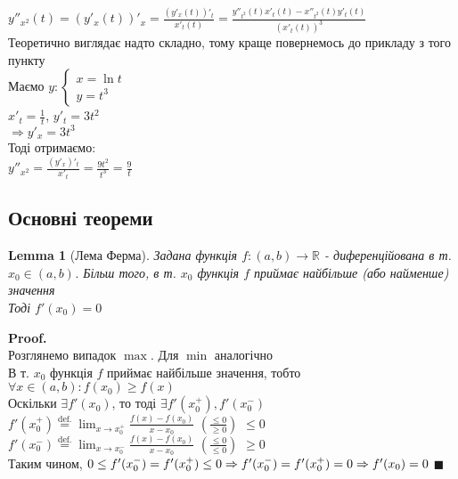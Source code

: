 \documentclass[a4paper, 14pt]{extarticle}
\def\huge{\displaystyle}
\def\bigline{\vspace{5mm}\\}
\theoremstyle{theoremdd}
\theoremstyle{theoremdd}
\theoremstyle{theoremdd}
\theoremstyle{theoremdd}
\theoremstyle{theoremdd}
\theoremstyle{theoremdd}
\theoremstyle{theoremdd}
\newtheorem{lemma}[theorem]{Lemma}
\theoremstyle{theoremdd}
\newenvironment{pf}{\vspace*{-3mm} \textbf{Proof. \\}}{$\blacksquare$}
\begin{document}
$\huge y''_{x^2}(t) = (y'_x(t))'_x = \frac{(y'_x(t))'_t}{x'_t(t)} = \frac{y''_{t^2}(t)x'_t(t)-x''_{t^2}(t)y'_t(t)}{(x'_t(t))^3}$
\bigline
Теоретично виглядає надто складно, тому краще повернемось до прикладу з того пункту\\
Маємо $y: \begin{cases} x = \ln t \\ y = t^3 \end{cases}$\\
$x'_t = \huge \frac{1}{t}$,    $y'_t = 3t^2$\\
$\Rightarrow y'_x = 3t^3$\\
Тоді отримаємо:\\
$y''_{x^2} = \huge \frac{(y'_x)'_t}{x'_t} = \frac{9t^2}{t^3} = \frac{9}{t}$
\bigline

\subsection{Основні теореми}
\begin{lemma}[Лема Ферма]
Задана функція $f: (a,b) \to \mathbb{R}$ - диференційована в т. $x_0 \in (a,b)$. Більш того, в т. $x_0$ функція $f$ приймає найбільше (або найменше) значення\\
Тоді $f'(x_0)=0$
\end{lemma}

\begin{pf}
Розглянемо випадок $\max$. Для $\min$ аналогічно\\
В т. $x_0$ функція $f$ приймає найбільше значення, тобто \\ $\forall x \in (a,b): f(x_0) \geq f(x)$\\
Оскільки $\exists f'(x_0)$, то тоді $\exists f'(x_0^+), f'(x_0^-)$\\
$f'(x_0^+) \huge \overset{\textrm{def.}}{=} \lim_{x \to x_0^+} \frac{f(x)-f(x_0)}{x-x_0}$  $\left( \frac{\leq 0}{\geq 0} \right)$ $\leq 0$\\
$f'(x_0^-) \huge \overset{\textrm{def.}}{=} \lim_{x \to x_0^-} \frac{f(x)-f(x_0)}{x-x_0}$ $\left( \frac{\leq 0}{\leq 0} \right)$ $\geq 0$\\
Таким чином, $0 \leq f'(x_0^-) = f'(x_0^+) \leq 0 \Rightarrow f'(x_0^-) = f'(x_0^+) = 0\\ \Rightarrow f'(x_0) = 0$
\end{pf}
\begin{figure}[H]
\centering
{}
\end{figure}
\end{document}
